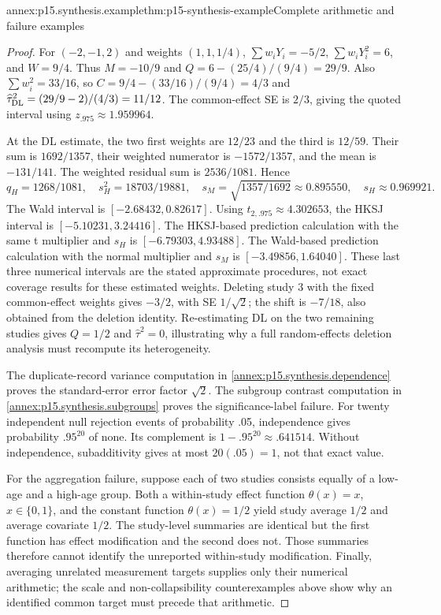 \begin{annexitem}{annex:p15.synthesis.example}{thm:p15-synthesis-example}{Complete arithmetic and failure examples}
\begin{proof}
For \((-2,-1,2)\) and weights \((1,1,1/4)\),
\(\sum w_iY_i=-5/2\), \(\sum w_iY_i^2=6\), and \(W=9/4\).
Thus \(M=-10/9\) and \(Q=6-(25/4)/(9/4)=29/9\).
Also \(\sum w_i^2=33/16\), so
\(C=9/4-(33/16)/(9/4)=4/3\) and
\(\widehat\tau_{\rm DL}^2=(29/9-2)/(4/3)=11/12\).
The common-effect SE is \(2/3\), giving the quoted interval using
\(z_{.975}\approx1.959964\).

At the DL estimate, the two first weights are \(12/23\) and the third
is \(12/59\). Their sum is \(1692/1357\), their weighted numerator
is \(-1572/1357\), and the mean is \(-131/141\).
The weighted residual sum is \(2536/1081\). Hence
\[
 q_H=1268/1081,\quad s_H^2=18703/19881,
 \quad s_M=\sqrt{1357/1692}\approx0.895550,
 \quad s_H\approx0.969921.
\]
The Wald interval is \([-2.68432,0.82617]\). Using
\(t_{2,.975}\approx4.302653\), the HKSJ interval is
\([-5.10231,3.24416]\). The HKSJ-based prediction calculation with
the same t multiplier and \(s_H\) is
\([-6.79303,4.93488]\). The Wald-based prediction calculation with
the normal multiplier and \(s_M\) is \([-3.49856,1.64040]\).
These last three numerical intervals are the stated approximate procedures,
not exact coverage results for these estimated weights. Deleting study 3
with the fixed common-effect weights gives \(-3/2\), with SE
\(1/\sqrt2\); the shift is \(-7/18\), also obtained from the deletion
identity. Re-estimating DL on the two remaining studies gives \(Q=1/2\)
and \(\widehat\tau^2=0\), illustrating why a full random-effects deletion
analysis must recompute its heterogeneity.

The duplicate-record variance computation in
\ref{annex:p15.synthesis.dependence} proves the standard-error error factor
\(\sqrt2\). The subgroup contrast computation in
\ref{annex:p15.synthesis.subgroups} proves the significance-label failure.
For twenty independent null rejection events of probability .05, independence
gives probability \(.95^{20}\) of none. Its complement is
\(1-.95^{20}\approx.641514\). Without independence, subadditivity
gives at most \(20(.05)=1\), not that exact value.

For the aggregation failure, suppose each of two studies consists equally
of a low-age and a high-age group. Both a within-study effect function
\(\theta(x)=x\), \(x\in\{0,1\}\), and the constant function
\(\theta(x)=1/2\) yield study average \(1/2\) and average covariate
\(1/2\). The study-level summaries are identical but the first function
has effect modification and the second does not. Those summaries therefore
cannot identify the unreported within-study modification. Finally, averaging
unrelated measurement targets supplies only their numerical arithmetic;
the scale and non-collapsibility counterexamples above show why an identified
common target must precede that arithmetic.
\end{proof}
\end{annexitem}
